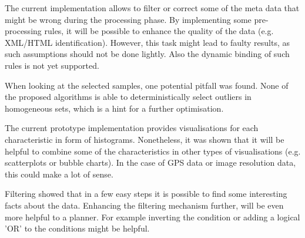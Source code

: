 The current implementation allows to filter or correct some of the meta data that might be wrong during the processing phase. By implementing some pre-processing rules, it will be possible to enhance the quality of the data (e.g. XML/HTML identification). However, this task might lead to faulty results, as such assumptions should not be done lightly. Also the dynamic binding of such rules is not yet supported.

When looking at the selected samples, one potential pitfall was found. None of the proposed algorithms is able to deterministically select outliers in homogeneous sets, which is a hint for a further optimisation.

The current prototype implementation provides visualisations for each characteristic in form of histograms. Nonetheless, it was shown that it will be helpful to combine some of the characteristics in other types of visualisations (e.g. scatterplots or bubble charts). In the case of GPS data or image resolution data, this could make a lot of sense.

Filtering showed that in a few easy steps it is possible to find some interesting facts about the data. Enhancing the filtering mechanism further, will be even more helpful to a planner. For example inverting the condition or adding a logical 'OR' to the conditions might be helpful.